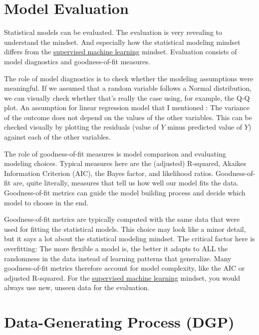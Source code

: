 \documentclass[
  10pt,
]{scrbook}
\begin{document}
\hypertarget{model-evaluation}{%
\section{Model Evaluation}\label{model-evaluation}}

Statistical models can be evaluated.
The evaluation is very revealing to understand the mindset.
And especially how the statistical modeling mindset differs from the \protect\hyperlink{supervised-ml}{supervised machine learning} mindset.
Evaluation consists of model diagnostics and goodness-of-fit measures.

The role of model diagnostics is to check whether the modeling assumptions were meaningful.
If we assumed that a random variable follows a Normal distribution, we can visually check whether that's really the case using, for example, the Q-Q plot.
An assumption for linear regression model that I mentioned : The variance of the outcome does not depend on the values of the other variables.
This can be checked visually by plotting the residuals (value of \(Y\) minus predicted value of \(Y\)) against each of the other variables.

The role of goodness-of-fit measures is model comparison and evaluating modeling choices.
Typical measures here are the (adjusted) R-squared, Akaikes Information Criterion (AIC), the Bayes factor, and likelihood ratios.
Goodness-of-fit are, quite literally, measures that tell us how well our model fits the data.
Goodness-of-fit metrics can guide the model building process and decide which model to choose in the end.

Goodness-of-fit metrics are typically computed with the same data that were used for fitting the statistical models.
This choice may look like a minor detail, but it says a lot about the statistical modeling mindset.
The critical factor here is overfitting: The more flexible a model is, the better it adapts to ALL the randomness in the data instead of learning patterns that generalize.
Many goodness-of-fit metrics therefore account for model complexity, like the AIC or adjusted R-squared.
For the \protect\hyperlink{supervised-ml}{supervised machine learning} mindset, you would always use new, unseen data for the evaluation.

\hypertarget{data-generating-process-dgp}{%
\section{Data-Generating Process (DGP)}\label{data-generating-process-dgp}}
\end{document}
